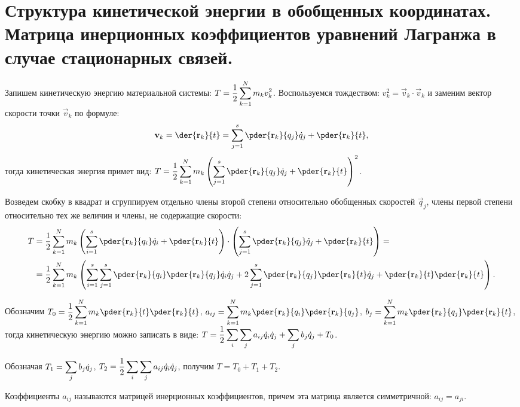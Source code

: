 \chapter{Структура кинетической энергии в обобщенных координатах. Матрица
инерционных коэффициентов уравнений Лагранжа в случае стационарных связей.}

Запишем кинетическую энергию материальной системы:
\( \displaystyle T = \frac{1}{2}\sum_{k=1}^N m_k v_k^2 \). Воспользуемся тождеством:
\( v_k^2 = \vec{v}_k\cdot\vec{v}_k \) и заменим вектор скорости точки
\( \vec{v}_k \) по формуле:
\[
    \vec{v}_k =\der{\vec{r}_k}{t} = \sum_{j=1}^s \pder{\vec{r}_k}{q_j}\dot{q}_j
    + \pder{\vec{r}_k}{t},
\]
тогда кинетическая энергия примет вид: \( \ds T = \frac{1}{2}\sum_{k=1}^N m_k
\left(\sum_{j=1}^s \pder{\vec{r}_k}{q_j}\dot{q}_j +
\pder{\vec{r}_k}{t}\right)^2 \).

Возведем скобку в квадрат и сгруппируем отдельно члены второй степени
относительно обобщенных скоростей \( \vec{q}_j \), члены первой степени
относительно тех же величин и члены, не содержащие скорости:
\begin{align*}
    T & = \frac{1}{2} \sum_{k=1}^N m_k\left( \sum_{i=1}^s \pder{\vec{r}_k}{q_i}
    \dot{q}_i + \pder{\vec{r}_k}{t} \right) \cdot \left( \sum_{j=1}^s
    \pder{\vec{r}_k}{q_j}\dot{q}_j + \pder{\vec{r}_k}{t} \right) = \\
    & =\frac{1}{2}\sum_{k=1}^N m_k\left( \sum_{i=1}^s\sum_{j=1}^s
    \pder{\vec{r}_k}{q_i}\pder{\vec{r}_k}{q_j}\dot{q}_i\dot{q}_j + 2\sum_{j=1}^s
    \pder{\vec{r}_k}{q_j}\pder{\vec{r}_k}{t}\dot{q}_j + \pder{\vec{r}_k}{t}
    \pder{\vec{r}_k}{t}\right).
\end{align*}

Обозначим \( \ds T_0 = \frac{1}{2}\sum_{k=1}^N m_k\pder{\vec{r}_k}{t}
\pder{\vec{r}_k}{t} \), \( \ds a_{ij} = \sum_{k=1}^N m_k \pder{\vec{r}_k}{q_i}
\pder{\vec{r}_k}{q_j} \), \( \ds b_j = \sum_{k=1}^N m_k \pder{\vec{r}_k}{q_j}
\pder{\vec{r}_k}{t} \), тогда кинетическую энергию можно записать в виде:
\( \displaystyle T = \frac{1}{2} \sum_i\sum_j a_{ij}\dot{q}_i\dot{q}_j +
\sum_j b_j\dot{q}_j + T_0 \).

Обозначая \( \displaystyle T_1 = \sum_j b_j\dot{q}_j \),
\( \displaystyle T_2 = \frac{1}{2} \sum_i\sum_j a_{ij}\dot{q}_i\dot{q}_j \), получим
\( T = T_0 + T_1 + T_2 \).

Коэффициенты \( a_{ij} \) называются матрицей инерционных коэффициентов, причем
эта матрица является симметричной: \( a_{ij} = a_{ji} \).

\newpage
